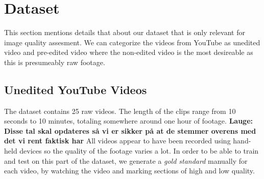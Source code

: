 \section{Dataset}
%
This section mentions details that about our dataset that is only relevant for image quality assesment. We can categorize the videos from YouTube as unedited video and pre-edited video where the non-edited video is the most desireable as this is presumeably raw footage.
%
\subsection{Unedited YouTube Videos}
%
The dataset contains 25 raw videos. The length of the clips range from 10 seconds to 10 minutes, totaling somewhere around one hour of footage. \textbf{Lauge: Disse tal skal opdateres så vi er sikker på at de stemmer overens med det vi rent faktisk har}
All videos appear to have been recorded using hand-held devices so the quality of the footage varies a lot. In order to be able to train and test on this part of the dataset, we generate a \textit{gold standard} manually for each video, by watching the video and marking sections of high and low quality. %
%
